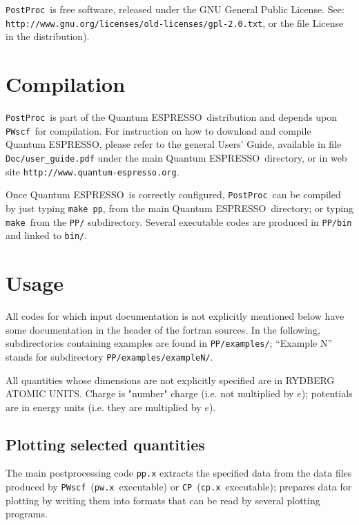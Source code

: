 \documentclass[12pt,a4paper]{article}
\def\qe{{\sc Quantum ESPRESSO}}
\def\pwx{\texttt{pw.x}}
\def\cpx{\texttt{cp.x}}
\def\PWscf{\texttt{PWscf}}
\def\CP{\texttt{CP}}
\def\PostProc{\texttt{PostProc}}
\def\make{\texttt{make}}
\begin{document}
\PostProc\ is free software, released under the 
GNU General Public License. See:\\
\texttt{http://www.gnu.org/licenses/old-licenses/gpl-2.0.txt}, 
or the file License in the distribution).
    


\section{Compilation}

\PostProc \ is part of the \qe \ distribution
and depends upon \PWscf\ for compilation.
For instruction on how to download and compile \qe, please refer 
to the general Users' Guide, available in file \texttt{Doc/user\_guide.pdf}
under the main \qe\ directory, or in web site 
\texttt{http://www.quantum-espresso.org}.

Once \qe\ is correctly configured, \PostProc\ can be compiled by
just typing \texttt{make pp}, from the main \qe\ directory;
or typing \make\ from the \texttt{PP/} subdirectory.
Several executable codes are produced in \texttt{PP/bin}
and linked to \texttt{bin/}.

\section{Usage}

All codes for which input documentation is not explicitly mentioned below
have some documentation in the header of the fortran sources.
In the following, subdirectories containing examples are found in
\texttt{PP/examples/}; ``Example N'' stands for subdirectory 
\texttt{PP/examples/exampleN/}.

All quantities whose dimensions are not explicitly specified are in
RYDBERG ATOMIC UNITS. Charge is "number" charge (i.e. not multiplied 
by $e$); potentials are in energy units (i.e. they are multiplied by 
$e$).

\subsection{Plotting selected quantities}
  
The main postprocessing code \texttt{pp.x} extracts the specified data
from the data files produced by \PWscf\ (\pwx\ executable) or \CP\ 
(\cpx\ executable); prepares data for plotting by writing them into 
formats that can be read by several plotting programs.
\end{document}
